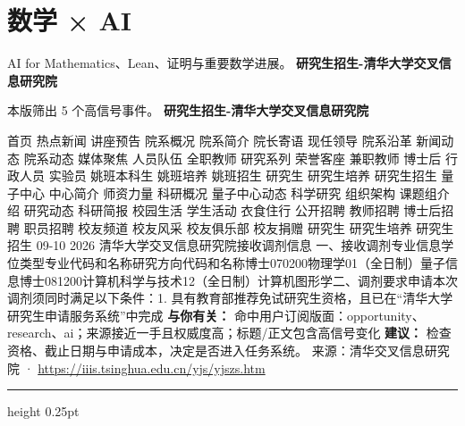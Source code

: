 \documentclass[10.5pt]{ctexart}
\begin{document}
\section*{数学 × AI}
{\color{ormuted} AI for Mathematics、Lean、证明与重要数学进展。}
\vspace{2mm}
{\LARGE\bfseries 研究生招生-清华大学交叉信息研究院}\par
\vspace{1mm}
{\color{ormuted} 本版筛出 5 个高信号事件。}
\vspace{3mm}
{\Large\bfseries 研究生招生-清华大学交叉信息研究院}\par
首页 热点新闻 讲座预告 院系概况 院系简介 院长寄语 现任领导 院系沿革 新闻动态 院系动态 媒体聚焦 人员队伍 全职教师 研究系列 荣誉客座 兼职教师 博士后 行政人员 实验员 姚班本科生 姚班培养 姚班招生 研究生 研究生培养 研究生招生 量子中心 中心简介 师资力量 科研概况 量子中心动态 科学研究 组织架构 课题组介绍 研究动态 科研简报 校园生活 学生活动 衣食住行 公开招聘 教师招聘 博士后招聘 职员招聘 校友频道 校友风采 校友俱乐部 校友捐赠 研究生 研究生培养 研究生招生 09-10 2026 清华大学交叉信息研究院接收调剂信息 一、接收调剂专业信息学位类型专业代码和名称研究方向代码和名称博士070200物理学01（全日制）量子信息博士081200计算机科学与技术12（全日制）计算机图形学二、调剂要求申请本次调剂须同时满足以下条件：1. 具有教育部推荐免试研究生资格，且已在“清华大学研究生申请服务系统”中完成
\textbf{与你有关：} 命中用户订阅版面：opportunity、research、ai；来源接近一手且权威度高；标题/正文包含高信号变化
\textbf{建议：} 检查资格、截止日期与申请成本，决定是否进入任务系统。
{\footnotesize\color{ormuted} 来源：清华交叉信息研究院 · \url{https://iiis.tsinghua.edu.cn/yjs/yjszs.htm}}
\vspace{4mm}
\hrule height 0.25pt
\vspace{3mm}
\end{document}
